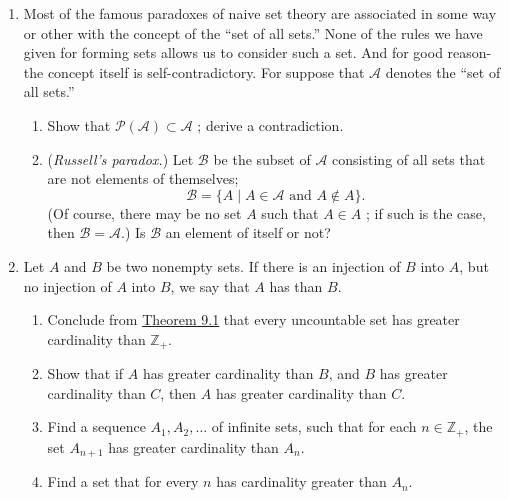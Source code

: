 \begin{enumerate}[itemsep=0.4em, parsep=0pt, topsep=0pt, partopsep=0pt, leftmargin=*, label=\arabic*., ref=\arabic*]
\begin{enumerate}[itemsep=0.2em, parsep=0pt, topsep=0pt, partopsep=0pt, leftmargin=*, label=(\alph*), align=left]
  \end{enumerate}
\item Most of the famous paradoxes of naive set theory are associated in some way or other with the concept of the ``set of all sets.'' None of the rules we have given for forming sets allows us to consider such a set. And for good reason-the concept itself is self-contradictory. For suppose that \(\mathcal{A}\) denotes the ``set of all sets.''
  \begin{enumerate}[itemsep=0.2em, parsep=0pt, topsep=0pt, partopsep=0pt, leftmargin=*, label=(\alph*), align=left]
  \item Show that \(\mathcal{P}( \mathcal{A}) \subset \mathcal{A}\) ; derive a contradiction.
  \item (\textsl{Russell's paradox.}) Let \(\mathcal{B}\) be the subset of \(\mathcal{A}\) consisting of all sets that are not elements of themselves; \[ \mathcal{B} = \{ A \mid A \in \mathcal{A}\text{ and }A \notin A\}. \] (Of course, there may be no set \(A\) such that \(A \in A\) ; if such is the case, then \(\mathcal{B} = \mathcal{A}\).) Is \(\mathcal{B}\) an element of itself or not?
  \end{enumerate}
\item Let \(A\) and \(B\) be two nonempty sets. If there is an injection of \(B\) into \(A\), but no injection of \(A\) into \(B\), we say that \(A\) has  than \(B\).
  \begin{enumerate}[itemsep=0.2em, parsep=0pt, topsep=0pt, partopsep=0pt, leftmargin=*, label=(\alph*), align=left]
  \item Conclude from \hyperref[thm:9.1]{Theorem 9.1} that every uncountable set has greater cardinality than \(\mathbb{Z}_{+}\).
  \item Show that if \(A\) has greater cardinality than \(B\), and \(B\) has greater cardinality than \(C\), then \(A\) has greater cardinality than \(C\).
  \item Find a sequence \(A_{1},A_{2},\ldots\) of infinite sets, such that for each \(n \in {\mathbb{Z}}_{+}\), the set \(A_{n + 1}\) has greater cardinality than \(A_{n}\).
  \item Find a set that for every \(n\) has cardinality greater than \(A_{n}\).
  \end{enumerate}


\end{enumerate}
